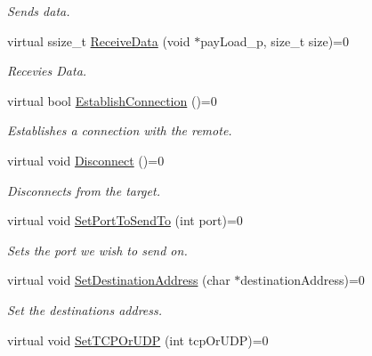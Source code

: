 \begin{DoxyCompactItemize}
\begin{DoxyCompactList}\small\item\em Sends data. \end{DoxyCompactList}\item 
virtual ssize\+\_\+t \mbox{\hyperlink{classlibNetworkCommunication_1_1I__libNetworkCommunication_ad8c03e24047f105a93549443c2ec2c92}{Receive\+Data}} (void $\ast$pay\+Load\+\_\+p, size\+\_\+t size)=0
\begin{DoxyCompactList}\small\item\em Recevies Data. \end{DoxyCompactList}\item 
virtual bool \mbox{\hyperlink{classlibNetworkCommunication_1_1I__libNetworkCommunication_a03c615443e3a028782677c78d559b1c1}{Establish\+Connection}} ()=0
\begin{DoxyCompactList}\small\item\em Establishes a connection with the remote. \end{DoxyCompactList}\item 
\mbox{\label{classlibNetworkCommunication_1_1I__libNetworkCommunication_ac00fde8c6490d27b18c49f14b2130cee}} 
virtual void \mbox{\hyperlink{classlibNetworkCommunication_1_1I__libNetworkCommunication_ac00fde8c6490d27b18c49f14b2130cee}{Disconnect}} ()=0
\begin{DoxyCompactList}\small\item\em Disconnects from the target. \end{DoxyCompactList}\item 
virtual void \mbox{\hyperlink{classlibNetworkCommunication_1_1I__libNetworkCommunication_a76dc179dc445ce063ad0ce969a0409c6}{Set\+Port\+To\+Send\+To}} (int port)=0
\begin{DoxyCompactList}\small\item\em Sets the port we wish to send on. \end{DoxyCompactList}\item 
virtual void \mbox{\hyperlink{classlibNetworkCommunication_1_1I__libNetworkCommunication_ad156b40d434a15fb553873f892dd2d0c}{Set\+Destination\+Address}} (char $\ast$destination\+Address)=0
\begin{DoxyCompactList}\small\item\em Set the destination\textquotesingle{}s address. \end{DoxyCompactList}\item 
virtual void \mbox{\hyperlink{classlibNetworkCommunication_1_1I__libNetworkCommunication_a66c9c4992979e7ccc7a2575a21ef3bf0}{Set\+T\+C\+P\+Or\+U\+DP}} (int tcp\+Or\+U\+DP)=0

\end{DoxyCompactItemize}
